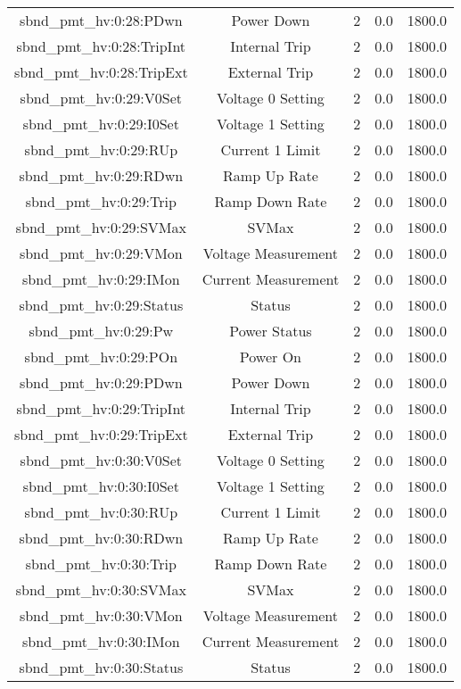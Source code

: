 \begin{table}[ptb]
\begin{tabular}{c | c c c c}
sbnd_pmt_hv:0:28:PDwn & Power Down & 2 & 0.0 & 1800.0\\ 
sbnd_pmt_hv:0:28:TripInt & Internal Trip & 2 & 0.0 & 1800.0\\ 
sbnd_pmt_hv:0:28:TripExt & External Trip & 2 & 0.0 & 1800.0\\ 
sbnd_pmt_hv:0:29:V0Set & Voltage 0 Setting & 2 & 0.0 & 1800.0\\ 
sbnd_pmt_hv:0:29:I0Set & Voltage 1 Setting & 2 & 0.0 & 1800.0\\ 
sbnd_pmt_hv:0:29:RUp & Current 1 Limit & 2 & 0.0 & 1800.0\\ 
sbnd_pmt_hv:0:29:RDwn & Ramp Up Rate & 2 & 0.0 & 1800.0\\ 
sbnd_pmt_hv:0:29:Trip & Ramp Down Rate & 2 & 0.0 & 1800.0\\ 
sbnd_pmt_hv:0:29:SVMax & SVMax & 2 & 0.0 & 1800.0\\ 
sbnd_pmt_hv:0:29:VMon & Voltage Measurement & 2 & 0.0 & 1800.0\\ 
sbnd_pmt_hv:0:29:IMon & Current Measurement & 2 & 0.0 & 1800.0\\ 
sbnd_pmt_hv:0:29:Status & Status & 2 & 0.0 & 1800.0\\ 
sbnd_pmt_hv:0:29:Pw & Power Status & 2 & 0.0 & 1800.0\\ 
sbnd_pmt_hv:0:29:POn & Power On & 2 & 0.0 & 1800.0\\ 
sbnd_pmt_hv:0:29:PDwn & Power Down & 2 & 0.0 & 1800.0\\ 
sbnd_pmt_hv:0:29:TripInt & Internal Trip & 2 & 0.0 & 1800.0\\ 
sbnd_pmt_hv:0:29:TripExt & External Trip & 2 & 0.0 & 1800.0\\ 
sbnd_pmt_hv:0:30:V0Set & Voltage 0 Setting & 2 & 0.0 & 1800.0\\ 
sbnd_pmt_hv:0:30:I0Set & Voltage 1 Setting & 2 & 0.0 & 1800.0\\ 
sbnd_pmt_hv:0:30:RUp & Current 1 Limit & 2 & 0.0 & 1800.0\\ 
sbnd_pmt_hv:0:30:RDwn & Ramp Up Rate & 2 & 0.0 & 1800.0\\ 
sbnd_pmt_hv:0:30:Trip & Ramp Down Rate & 2 & 0.0 & 1800.0\\ 
sbnd_pmt_hv:0:30:SVMax & SVMax & 2 & 0.0 & 1800.0\\ 
sbnd_pmt_hv:0:30:VMon & Voltage Measurement & 2 & 0.0 & 1800.0\\ 
sbnd_pmt_hv:0:30:IMon & Current Measurement & 2 & 0.0 & 1800.0\\ 
sbnd_pmt_hv:0:30:Status & Status & 2 & 0.0 & 1800.0\\ 

\end{tabular}
\end{table}
